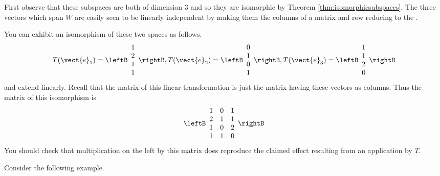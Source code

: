 \begin{solution}
First observe that these subspaces are both of dimension 3 and so they are isomorphic by Theorem \ref{thm:isomorphicsubspaces}. The
three vectors which span $W$ are easily seen to be linearly independent by
making them the columns of a matrix and row reducing to the \rref.

You can exhibit an isomorphism of these two spaces as follows. 
\begin{equation*}
T(\vect{e}_{1})=\leftB 
\begin{array}{c}
1 \\ 
2 \\ 
1 \\ 
1
\end{array}
\rightB, T(\vect{e}_{2})=\leftB 
\begin{array}{c}
0 \\ 
1 \\ 
0 \\ 
1
\end{array}
\rightB, T(\vect{e}_{3})=\leftB 
\begin{array}{c}
1 \\ 
1 \\ 
2 \\ 
0
\end{array}
\rightB
\end{equation*}
and extend linearly. Recall that the matrix of this linear transformation is
just the matrix having these vectors as columns. Thus the matrix of this
isomorphism is 
\begin{equation*}
\leftB 
\begin{array}{rrr}
1 & 0 & 1 \\ 
2 & 1 & 1 \\ 
1 & 0 & 2 \\ 
1 & 1 & 0
\end{array}
\rightB
\end{equation*}
You should check that multiplication on the left by this matrix does
reproduce the claimed effect resulting from an application by $T$.
\end{solution}

Consider the following example. 

